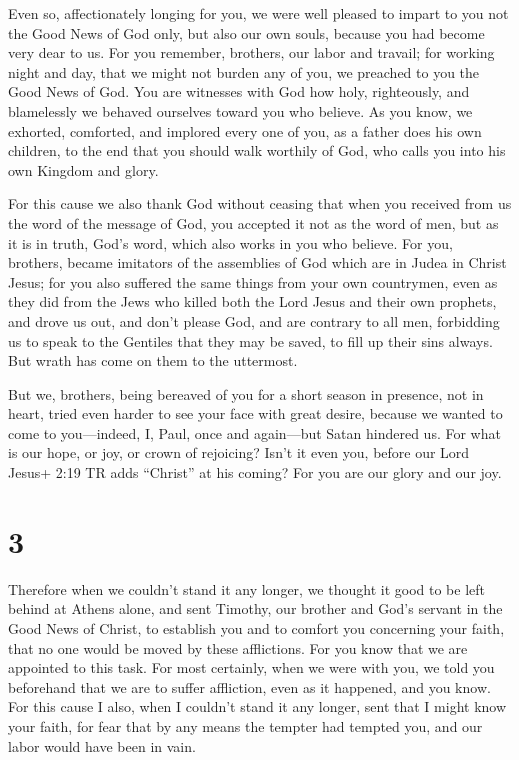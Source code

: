  Even so, affectionately longing for you, we were well
pleased to impart to you not the Good News of God only, but also our own
souls, because you had become very dear to us.  For you
remember, brothers, our labor and travail; for working night and day,
that we might not burden any of you, we preached to you the Good News of
God.  You are witnesses with God how holy, righteously, and
blamelessly we behaved ourselves toward you who believe. 
As you know, we exhorted, comforted, and implored every one of you, as a
father does his own children,  to the end that you should
walk worthily of God, who calls you into his own Kingdom and glory.

 For this cause we also thank God without ceasing that when
you received from us the word of the message of God, you accepted it not
as the word of men, but as it is in truth, God's word, which also works
in you who believe.  For you, brothers, became imitators of
the assemblies of God which are in Judea in Christ Jesus; for you also
suffered the same things from your own countrymen, even as they did from
the Jews  who killed both the Lord Jesus and their own
prophets, and drove us out, and don't please God, and are contrary to
all men,  forbidding us to speak to the Gentiles that they
may be saved, to fill up their sins always. But wrath has come on them
to the uttermost.

 But we, brothers, being bereaved of you for a short season
in presence, not in heart, tried even harder to see your face with great
desire,  because we wanted to come to you---indeed, I,
Paul, once and again---but Satan hindered us.  For what is
our hope, or joy, or crown of rejoicing? Isn't it even you, before our
Lord Jesus+ 2:19 TR adds ``Christ'' at his coming?  For you
are our glory and our joy.

\hypertarget{section-2}{%
\section{3}\label{section-2}}

 Therefore when we couldn't stand it any longer, we thought
it good to be left behind at Athens alone,  and sent
Timothy, our brother and God's servant in the Good News of Christ, to
establish you and to comfort you concerning your faith, 
that no one would be moved by these afflictions. For you know that we
are appointed to this task.  For most certainly, when we
were with you, we told you beforehand that we are to suffer affliction,
even as it happened, and you know.  For this cause I also,
when I couldn't stand it any longer, sent that I might know your faith,
for fear that by any means the tempter had tempted you, and our labor
would have been in vain.

